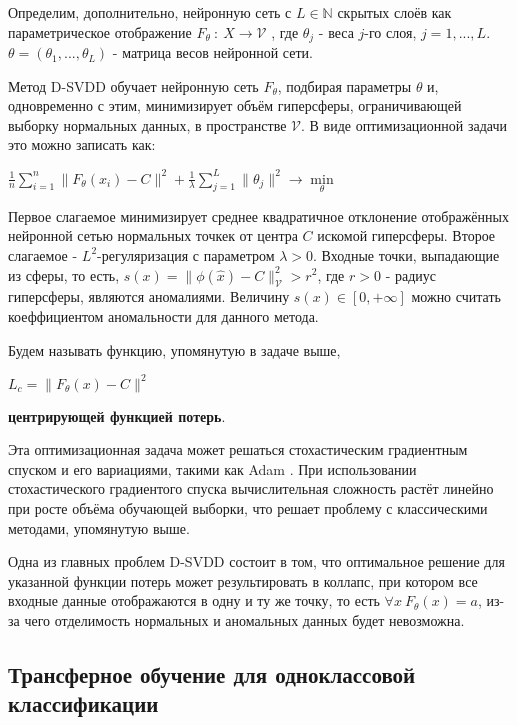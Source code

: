 \documentclass{article}
\begin{document}
\begin{large}
Определим, дополнительно, нейронную сеть с $L \in \mathbb{N}$ скрытых слоёв как параметрическое отображение $F_{\theta} \ : \ X \rightarrow \mathcal{V}$ , где $\theta_j$ - веса $j$-го слоя, $j=1,...,L$. $\theta = (\theta_1, ..., \theta_L)$ - матрица весов нейронной сети.

Метод D-SVDD обучает нейронную сеть $F_{\theta}$, подбирая параметры $\theta$ и, одновременно с этим, минимизирует объём гиперсферы, ограничивающей выборку нормальных данных, в пространстве $\mathcal{V}$. В виде оптимизационной задачи это можно записать как:
\begin{center}
	$\frac{1}{n} \sum\limits_{i=1}^{n} \| F_{\theta}(x_i) - C \|^2 + \frac{1}{\lambda} \sum\limits_{j=1}^{L} \| \theta_j \|^2 \rightarrow \min\limits_{\theta}$
\end{center}

Первое слагаемое минимизирует среднее квадратичное отклонение отображённых нейронной сетью нормальных точкек от центра $C$ искомой гиперсферы. Второе слагаемое - $L^2$-регуляризация с параметром $\lambda > 0$. Входные точки, выпадающие из сферы, то есть, $s(x) = \|\phi(\hat x) - C \|^2_{\mathcal{V}} > r^2$, где $r > 0$ - радиус гиперсферы, являются аномалиями. Величину $s(x) \in [0, +\infty]$ можно считать коеффициентом аномальности для данного метода.

Будем называть функцию, упомянутую в задаче выше,
\begin{center}
	$L_c = \| F_{\theta}(x) - C \|^2$
\end{center}
\textbf{центрирующей функцией потерь}.

Эта оптимизационная задача может решаться стохастическим градиентным спуском и его вариациями, такими как Adam \cite{adam}. При использовании стохастического градиентого спуска вычислительная сложность растёт линейно при росте объёма обучающей выборки, что решает проблему с классическими методами, упомянутую выше.

Одна из главных проблем D-SVDD состоит в том, что оптимальное решение для указанной функции потерь может результировать в коллапс, при котором все входные данные отображаются в одну и ту же точку, то есть $\forall x \ F_{\theta}(x) = a$, из-за чего отделимость нормальных и аномальных данных будет невозможна.

\subsection{Трансферное обучение для одноклассовой классификации}


\end{large}
\end{document}
